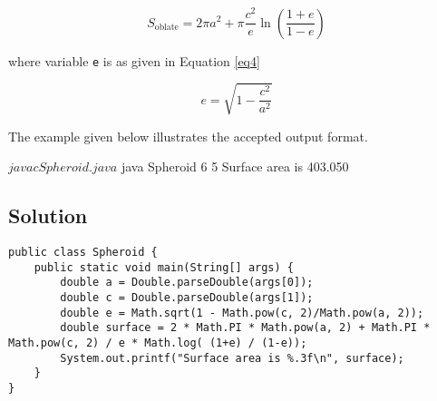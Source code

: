 \begin{equation}
S_{\text{oblate}} = 2\pi a^2 + \pi \frac{c^2}{e} \ln \left(\frac{1+e}{1-e} \right)
\label{eq3}
\end{equation}

where variable \texttt{e} is as given in Equation \ref{eq4}

\begin{equation}
e = \sqrt{1 - \frac{c^2}{a^2}}
\label{eq4}
\end{equation}

The example given below illustrates the accepted output format.

\begin{terminal}
$ javac Spheroid.java
$ java Spheroid 6 5
Surface area is 403.050
\end{terminal}

\subsection*{Solution}
\lstset{language=Java,tabsize=2}
\begin{lstlisting}
public class Spheroid {
	public static void main(String[] args) {
		double a = Double.parseDouble(args[0]);
		double c = Double.parseDouble(args[1]);
		double e = Math.sqrt(1 - Math.pow(c, 2)/Math.pow(a, 2));
		double surface = 2 * Math.PI * Math.pow(a, 2) + Math.PI * Math.pow(c, 2) / e * Math.log( (1+e) / (1-e));
		System.out.printf("Surface area is %.3f\n", surface);
	}
}
\end{lstlisting}
